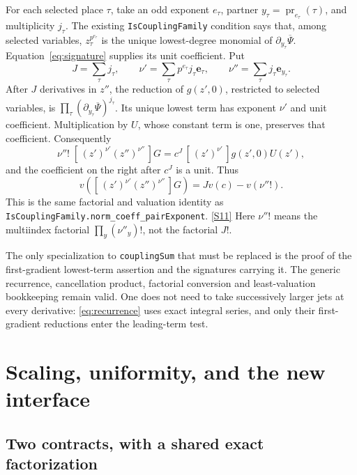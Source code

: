\documentclass[11pt,letterpaper]{article}
\theoremstyle{remark}
\newcommand{\coef}[2]{[\, #1\,]#2}
\newcommand{\code}[1]{{\small\nolinkurl{#1}}}
\newcommand{\src}[1]{\hyperref[src:#1]{[S#1]}}
\begin{document}
For each selected place \(\tau\), take an odd exponent \(e_\tau\), partner
\(y_\tau=\operatorname{pr}_{e_\tau}(\tau)\), and multiplicity \(j_\tau\).
The existing \code{IsCouplingFamily} condition says that, among selected
variables, \(z_\tau^{p^{e_\tau}}\) is the unique lowest-degree monomial of
\(\partial_{y_\tau}\overline\Psi\). Equation~\eqref{eq:signature} supplies
its unit coefficient. Put
\[
 J=\sum_\tau j_\tau,\qquad
 \nu'=\sum_\tau p^{e_\tau}j_\tau\mathbf e_\tau,\qquad
 \nu''=\sum_\tau j_\tau\mathbf e_{y_\tau}.
\]
After \(J\) derivatives in \(z''\), the reduction of \(g(z',0)\), restricted
to selected variables, is
\(\prod_\tau(\partial_{y_\tau}\overline\Psi)^{j_\tau}\).
Its unique lowest term has exponent \(\nu'\) and unit coefficient.
Multiplication by \(U\), whose constant term is one, preserves that coefficient.
Consequently
\[
 \nu''!\;\coef{(z')^{\nu'}(z'')^{\nu''}}G
       =c^J\,\coef{(z')^{\nu'}}{g(z',0)U(z')},
\]
and the coefficient on the right after \(c^J\) is a unit. Thus
\begin{equation}
 v\!\left(\coef{(z')^{\nu'}(z'')^{\nu''}}G\right)
       =Jv(c)-v(\nu''!). \label{eq:sharpvalue}
\end{equation}
This is the same factorial and valuation identity as
\code{IsCouplingFamily.norm_coeff_pairExponent}. \src{11}
Here \(\nu''!\) means the multiindex factorial
\(\prod_y(\nu''_y)!\), not the factorial \(J!\).

The only specialization to \code{couplingSum} that must be replaced is the
proof of the first-gradient lowest-term assertion and the signatures carrying
it. The generic recurrence, cancellation product, factorial conversion and
least-valuation bookkeeping remain valid. One does not need to take successively
larger jets at every derivative: \eqref{eq:recurrence} uses exact integral
series, and only their first-gradient reductions enter the leading-term test.

\section{Scaling, uniformity, and the new interface}
\label{sec:interface}

\subsection{Two contracts, with a shared exact factorization}
\end{document}
